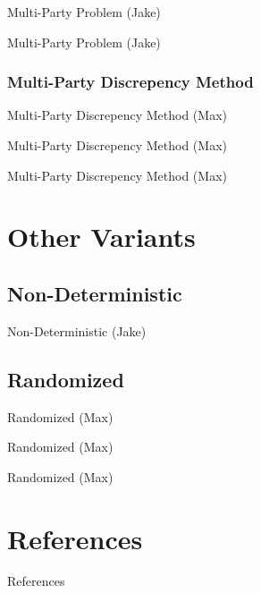\documentclass{beamer}
\begin{document}
\begin{frame}{Multi-Party Problem (Jake)}

\end{frame}

\begin{frame}{Multi-Party Problem (Jake)}

\end{frame}

\subsubsection{Multi-Party Discrepency Method}

\begin{frame}{Multi-Party Discrepency Method (Max)}

\end{frame}

\begin{frame}{Multi-Party Discrepency Method (Max)}

\end{frame}

\begin{frame}{Multi-Party Discrepency Method (Max)}

\end{frame}

\section{Other Variants}

\subsection{Non-Deterministic}

\begin{frame}{Non-Deterministic (Jake)}

\end{frame}

\subsection{Randomized}

\begin{frame}{Randomized (Max)}

\end{frame}

\begin{frame}{Randomized (Max)}

\end{frame}

\begin{frame}{Randomized (Max)}

\end{frame}

\section{References}

\begin{frame}[t, allowframebreaks]{References}


\end{frame}
\end{document}
